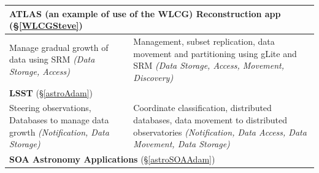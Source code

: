 \begin{table}[h]
\begin{scriptsize}
\begin{center}
\begin{tabular}{|p{6.7cm}|p{6.7cm}|}
\\
		\hline
\multicolumn{2}{|l|}{{\textbf{ATLAS (an example of use of the WLCG) Reconstruction app} (\S\ref{WLCGSteve})}} \\ \hline
Manage gradual growth of data using SRM \emph{(Data Storage, Access)}
&
Management, subset replication, data movement and partitioning using gLite and SRM \emph{(Data
  Storage, Access, Movement, Discovery)}
              \\
		\hline
\multicolumn{2}{|l|}{{\textbf{LSST} (\S\ref{astroAdam})}} \\ \hline	
	
Steering observations, Databases to manage data growth \emph{(Notification, Data Storage)}
            &
Coordinate classification, distributed databases, data movement to distributed observatories
\emph{(Notification, Data Access, Data Movement, Data Storage)} %
\\
		\hline
\multicolumn{2}{|l|}{{\textbf{SOA Astronomy Applications} (\S\ref{astroSOAAdam})}} \\ \hline	
	

\end{tabular}
\end{center}
\end{scriptsize}
\end{table}
